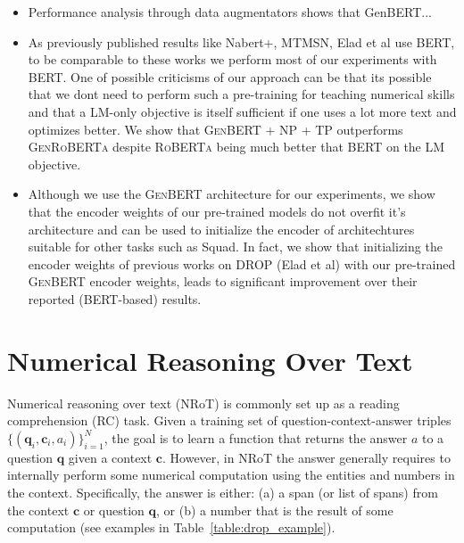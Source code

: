 \documentclass[11pt,a4paper]{article}
\newcommand\bert{\textsc{BERT}}
\newcommand\roberta{\textsc{RoBERTa}}
\newcommand\genbert{\textsc{GenBERT}}
\newcommand\genroberta{\textsc{GenRoBERTa}}
\newcommand\question{\mathbf{q}}
\newcommand\context{\mathbf{c   }}
\begin{document}
{\begin{itemize}
    \item Performance analysis through data augmentators shows that GenBERT...
    
    \item As previously published results like Nabert+, MTMSN, Elad et al use \bert{}, to be comparable to these works we perform most of our experiments with \bert{}. One of possible criticisms of our approach can be that its possible that we dont need to perform such a pre-training for teaching numerical skills and that a LM-only objective is itself sufficient if one uses a lot more text and optimizes better. We show that \genbert{} + NP + TP outperforms \genroberta{} despite \roberta{} being much better that \bert{} on the LM objective.
    
    \item Although we use the \genbert{} architecture for our experiments, we show that the encoder weights of our pre-trained models do not overfit it's architecture and can be used to initialize the encoder of architechtures suitable for other tasks such as Squad. In fact, we show that initializing the encoder weights of previous works on DROP (Elad et al) with our pre-trained \genbert{} encoder weights, leads to significant improvement over their reported (\bert{}-based) results.
    
\end{itemize}
}


 \section{Numerical Reasoning Over Text}
\label{sec:background}


Numerical reasoning over text (NRoT) is commonly set up as a reading
comprehension (RC) task. Given a training set of question-context-answer triples
$\{(\question_i, \context_i, a_i)\}_{i=1}^N$, the goal is to learn a function
that returns the answer $a$ to a  question $\question$ given a context
$\context$. However, in NRoT the answer generally requires to internally perform
some numerical computation using the entities and numbers in the context.
Specifically, the answer is either: (a) a span (or list of spans) from the
context $\context$ or question $\question$, or (b) a number that is the result of some computation (see examples in Table~\ref{table:drop_example}).
\end{document}
